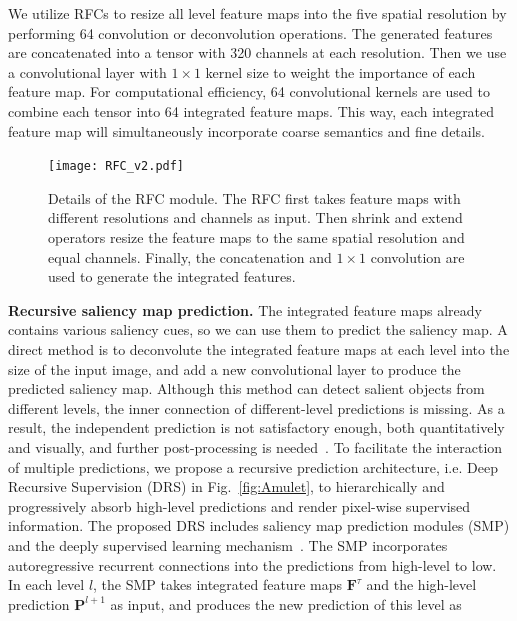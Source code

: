 \documentclass[10pt,twocolumn,letterpaper]{article}
\begin{document}
%
We utilize RFCs to resize all level feature maps into the five spatial resolution by performing 64 convolution or deconvolution operations.
%
The generated features are concatenated into a tensor with 320 channels at each resolution.
%
Then we use a convolutional layer with $1\times 1$ kernel size to weight the importance of each feature map.
%
For computational efficiency, 64 convolutional kernels are used to combine each tensor into 64 integrated feature maps.
%
This way, each integrated feature map will simultaneously incorporate coarse semantics and fine details.
\begin{figure}
\begin{center}
\texttt{[image: RFC\_v2.pdf]}
\end{center}
\vspace{-4mm}
\caption{Details of the RFC module. The RFC first takes feature maps with different resolutions and channels as input. Then shrink and extend operators resize the feature maps to the same spatial resolution and equal channels. Finally, the concatenation and $1\times1$ convolution are used to generate the integrated features.}
\label{fig:RFC}
\vspace{-5mm}
\end{figure}
\vspace{-5mm}
{\flushleft \textbf{Recursive saliency map prediction.}}
The integrated feature maps already contains various saliency cues, so we can use them to predict the saliency map.
%
A direct method is to deconvolute the integrated feature maps at each level into the size of the input image, and add a new convolutional layer to produce the predicted saliency map.
%
Although this method can detect salient objects from different levels, the inner connection of different-level predictions is missing.
%
As a result, the independent prediction is not satisfactory enough, both quantitatively and visually, and further
post-processing is needed~\cite{Li2016DeepSaliency,wang2016saliency}.
%
To facilitate the interaction of multiple predictions, we propose a recursive prediction architecture, i.e. Deep Recursive Supervision (DRS) in Fig.~\ref{fig:Amulet}, to hierarchically and progressively absorb high-level predictions and render pixel-wise supervised information.
%
The proposed DRS includes saliency map prediction modules (SMP) and the deeply supervised learning mechanism~\cite{xie2015holistically}.
%
The SMP incorporates autoregressive recurrent connections into the predictions from high-level to low.
%
In each level $l$, the SMP takes integrated feature maps $\textbf{F}^{\tau}$ and the high-level prediction $\textbf{P}^{l+1}$ as input, and produces the new prediction of this level as
\end{document}
